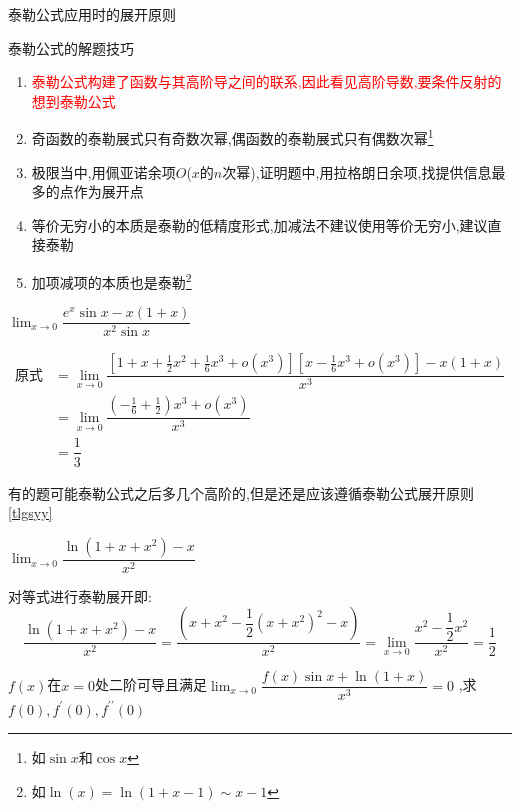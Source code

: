 \documentclass[8pt a4paper, oneside, UTF8]{ctexbook}
\begin{document}
\begin{sloppypar}
\begin{criterion}{泰勒公式应用时的展开原则\label{tlgsyy}}{}
\begin{itemize}
        \end{itemize}
    \end{criterion}
    \begin{criterion}{泰勒公式的解题技巧}{}
        \begin{enumerate}
            \item \textcolor{red}{泰勒公式构建了函数与其高阶导之间的联系,因此看见高阶导数,要条件反射的想到泰勒公式}
            \item 奇函数的泰勒展式只有奇数次幂,偶函数的泰勒展式只有偶数次幂\footnote{如$\sin x$和$\cos x$}
            \item 极限当中,用佩亚诺余项$O$($x$的$n$次幂),证明题中,用拉格朗日余项,找提供信息最多的点作为展开点
            \item 等价无穷小的本质是泰勒的低精度形式,加减法不建议使用等价无穷小,建议直接泰勒
            \item 加项减项的本质也是泰勒\footnote{如$\ln(x)=\ln(1+x-1)\sim x-1$}
        \end{enumerate}
    \end{criterion}
    \begin{problem}
        $\lim_{x\to 0}\dfrac{e^x \sin x-x(1+x)}{x^2\sin x}$
    \end{problem}
    \begin{solution}
        \begin{align*}
          \text{原式} & = \lim_{x \to 0} \dfrac{\left[1+x+\frac12x^2+\frac16x^3+o(x^3)\right]\left[x-\frac16x^3+o(x^3)\right]-x(1+x)}{x^3} \\
          & = \lim_{x\to0}\dfrac{\left(-\frac{1}{6}+\frac{1}{2}\right)x^3+o\left(x^3\right)}{x^3}\\
          & = \dfrac13
        \end{align*}
    \end{solution}
    \begin{note}
        有的题可能泰勒公式之后多几个高阶的,但是还是应该遵循泰勒公式展开原则\ref{tlgsyy}
    \end{note}
    \begin{problem}
        $\lim_{x\to0}\dfrac{\ln\left(1+x+x^{2}\right)-x}{x^{2}}$
    \end{problem}
    \begin{solution}
        对等式进行泰勒展开即:$$\dfrac{\ln(1+x+x^2)-x}{x^2}=\dfrac{(x+x^2-\dfrac{1}{2}(x+x^2)^2-x)}{x^2}=\lim_{x \to 0}\dfrac{x^2-\dfrac{1}{2}x^2}{x^2}=\dfrac{1}{2}$$
    \end{solution}
    \begin{problem}
        $f(x)$在$x=0$处二阶可导且满足$\lim_{x\to 0}\dfrac{f(x)\sin x+\ln(1+x)}{x^3}=0$ ,求$f(0),f^{\prime}(0),f^{\prime\prime}(0)$

\end{problem}
\end{sloppypar}
\end{document}
